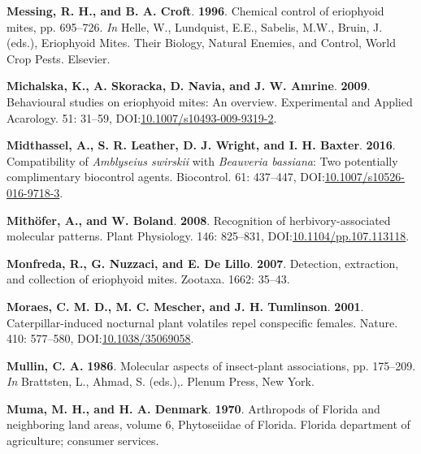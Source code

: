 \documentclass[12pt,final,CPage]{ufthesis}
\newlength{\cslhangindent}
\newenvironment{CSLReferences}[2] %
{%
	\setlength{\parindent}{0pt}
	\ifodd #1 \everypar{\setlength{\hangindent}{\cslhangindent}}\ignorespaces\fi
	\ifnum #2 > 0
	\setlength{\parskip}{#2\baselineskip}
	\fi
}%
{}
\begin{document}
{\begin{CSLReferences}{1}{0}
  \leavevmode{}%
  \textbf{Messing, R. H., and B. A. Croft}. \textbf{1996}. Chemical control of eriophyoid mites, pp. 695--726. \emph{In} Helle, W., Lundquist, E.E., Sabelis, M.W., Bruin, J. (eds.), Eriophyoid Mites. Their Biology, Natural Enemies, and Control, World Crop Pests. Elsevier.

  \leavevmode{}%
  \textbf{Michalska, K., A. Skoracka, D. Navia, and J. W. Amrine}. \textbf{2009}. Behavioural studies on eriophyoid mites: An overview. Experimental and Applied Acarology. 51: 31--59, DOI:\href{https://doi.org/10.1007/s10493-009-9319-2}{10.1007/s10493-009-9319-2}.

  \leavevmode{}%
  \textbf{Midthassel, A., S. R. Leather, D. J. Wright, and I. H. Baxter}. \textbf{2016}. Compatibility of {\emph{Amblyseius swirskii}} with {\emph{Beauveria bassiana}}: Two potentially complimentary biocontrol agents. Biocontrol. 61: 437--447, DOI:\href{https://doi.org/10.1007/s10526-016-9718-3}{10.1007/s10526-016-9718-3}.

  \leavevmode{}%
  \textbf{Mithöfer, A., and W. Boland}. \textbf{2008}. Recognition of herbivory-associated molecular patterns. Plant Physiology. 146: 825--831, DOI:\href{https://doi.org/10.1104/pp.107.113118}{10.1104/pp.107.113118}.

  \leavevmode{}%
  \textbf{Monfreda, R., G. Nuzzaci, and E. De Lillo}. \textbf{2007}. Detection, extraction, and collection of eriophyoid mites. Zootaxa. 1662: 35--43.

  \leavevmode{}%
  \textbf{Moraes, C. M. D., M. C. Mescher, and J. H. Tumlinson}. \textbf{2001}. Caterpillar-induced nocturnal plant volatiles repel conspecific females. Nature. 410: 577--580, DOI:\href{https://doi.org/10.1038/35069058}{10.1038/35069058}.

  \leavevmode{}%
  \textbf{Mullin, C. A.} \textbf{1986}. Molecular aspects of insect-plant associations, pp. 175--209. \emph{In} Brattsten, L., Ahmad, S. (eds.),. Plenum Press, New York.

  \leavevmode{}%
  \textbf{Muma, M. H., and H. A. Denmark}. \textbf{1970}. Arthropods of {Florida} and neighboring land areas, volume 6, {Phytoseiidae} of {Florida}. Florida department of agriculture; consumer services.


\end{CSLReferences}}
\end{document}

